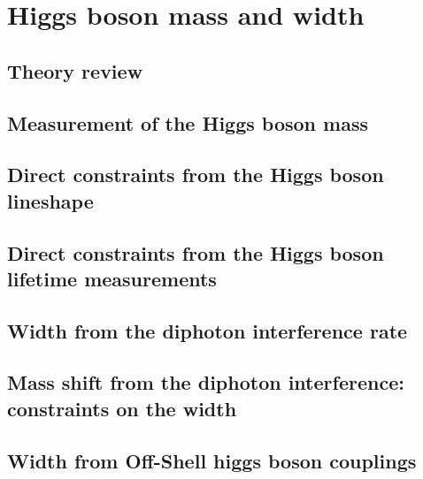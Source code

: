 \documentclass[../report.tex]{subfiles}
\providecommand{\main}{..}
\begin{document}
\section{Higgs boson mass and width}\label{sec5}

\subsection{Theory review}


\subsection{Measurement of the Higgs boson mass}

\subsection{Direct constraints from the Higgs boson lineshape}
\label{sec:5_mass}

\subsection{Direct constraints from the Higgs boson lifetime measurements}
\label{sec:5_lifetime}

\subsection{Width from the diphoton interference rate}
\label{sec:5_interference_real}


\subsection{Mass shift from the diphoton interference: constraints on the width}
\label{sec:5_interference_imag}

\subsection{Width from Off-Shell higgs boson couplings}
\label{sec:5_offshell}

%
%
\end{document}
